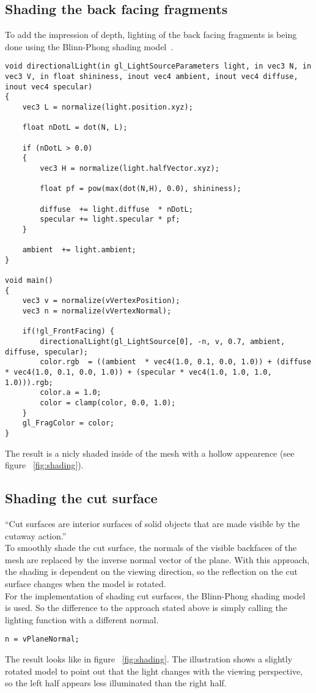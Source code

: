\subsection{Shading the back facing fragments}
To add the impression of depth, lighting of the back facing fragments is being done using the Blinn-Phong shading model~\cite{book:computerGraphicsHearn}.
\begin{lstlisting}
void directionalLight(in gl_LightSourceParameters light, in vec3 N, in vec3 V, in float shininess, inout vec4 ambient, inout vec4 diffuse, inout vec4 specular)
{
	vec3 L = normalize(light.position.xyz);
	 
	float nDotL = dot(N, L);
	 
	if (nDotL > 0.0)
	{   
		vec3 H = normalize(light.halfVector.xyz);
			 
		float pf = pow(max(dot(N,H), 0.0), shininess);

		diffuse  += light.diffuse  * nDotL;
		specular += light.specular * pf;
	}
	 
	ambient  += light.ambient;
}

void main()
{
	vec3 v = normalize(vVertexPosition);
	vec3 n = normalize(vVertexNormal);
	
	if(!gl_FrontFacing) {
		directionalLight(gl_LightSource[0], -n, v, 0.7, ambient, diffuse, specular);
		color.rgb  = ((ambient  * vec4(1.0, 0.1, 0.0, 1.0)) + (diffuse  * vec4(1.0, 0.1, 0.0, 1.0)) + (specular * vec4(1.0, 1.0, 1.0, 1.0))).rgb;			
		color.a = 1.0;			
		color = clamp(color, 0.0, 1.0);
	}
	gl_FragColor = color;
}
\end{lstlisting}

The result is a nicly shaded inside of the mesh with a hollow appearence (see figure ~\ref{fig:shading}).

\subsection{Shading the cut surface}
"`Cut surfaces are interior surfaces of solid objects that are made visible by the cutaway action."'~\cite{jour:adaptiveCutaways}\\
To smoothly shade the cut surface, the normals of the visible backfaces of the mesh are replaced by the inverse normal vector of the plane. With this approach, the shading is dependent on the viewing direction, so the reflection on the cut surface changes when the model is rotated.\\
For the implementation of shading cut surfaces, the Blinn-Phong shading model is used. So the difference to the approach stated above is simply calling the lighting function with a different normal.
\begin{lstlisting}
n = vPlaneNormal;
\end{lstlisting}
The result looks like in figure ~\ref{fig:shading}. The illustration shows a slightly rotated model to point out that the light changes with the viewing perspective, so the left half appears less illuminated than the right half.

